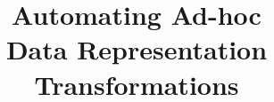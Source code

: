 \documentclass[runningheads,a4paper]{style/llncs}
\begin{document}
\mainmatter
\title{Automating Ad-hoc \\Data Representation Transformations}
\author{}
\institute{}
\maketitle


% 











\end{document}

